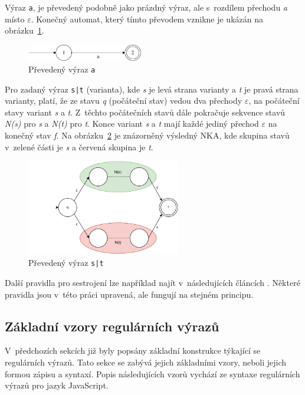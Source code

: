 Výraz \texttt{a}, je převedený podobně jako prázdný výraz, ale s~rozdílem přechodu \textit{a} místo \textit{$\varepsilon$}.
Konečný automat, který tímto převodem vznikne je ukázán na obrázku~\ref{fig:NFAa}.
\begin{figure}[!h]
	\centering
	\includegraphics[width=0.45\textwidth]{Figures/NFA_a.pdf}
	\caption{Převedený výraz \texttt{a}}
	\label{fig:NFAa}
\end{figure}

Pro zadaný výraz \texttt{s|t} (varianta), kde \textit{s} je levá strana varianty a \textit{t} je pravá strana varianty, platí, že ze stavu \textit{q} (počáteční stav) vedou dva přechody
\textit{$\varepsilon$}, na počáteční stavy variant \textit{s} a \textit{t}. 
Z~těchto počátečních stavů dále pokračuje sekvence stavů \textit{N(s)} pro \textit{s} a \textit{N(t)} pro \textit{t}.
Konce variant \textit{s} a \textit{t} mají každé jediný přechod \textit{$\varepsilon$} na konečný stav \textit{f}.
Na obrázku~\ref{fig:NFAunion} je znázorněný výsledný NKA, kde skupina stavů v~zelené části je \textit{s} a červená skupina je \textit{t}.
\begin{figure}[!h]
	\centering
	\includegraphics[width=0.6\textwidth]{Figures/NFA_union.pdf}
	\caption{Převedený výraz \texttt{s|t}}
	\label{fig:NFAunion}
\end{figure}

Další pravidla pro sestrojení lze například najít v~následujících článcích \cite{Thompson1,Thompson2}.
Některé pravidla jsou v~této práci upravená, ale fungují na stejném principu.

\subsection*{Základní vzory regulárních výrazů}
V~předchozích sekcích již byly popsány základní konstrukce týkající se regulárních výrazů.
Tato sekce se zabývá jejich základními vzory, neboli jejich formou zápisu a syntaxí.
Popis následujících vzorů vychází ze syntaxe regulárních výrazů pro jazyk JavaScript.

